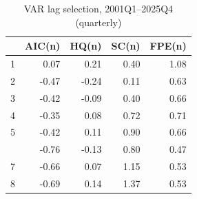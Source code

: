\begin{table}

\caption{\label{tab:tbl-var-select-q}VAR lag selection, 2001Q1--2025Q4 (quarterly)}
\centering
\begin{tabular}[t]{lrrrr}
\toprule
  & AIC(n) & HQ(n) & SC(n) & FPE(n)\\
\midrule
1 & 0.07 & 0.21 & 0.40 & 1.08\\
2 & -0.47 & -0.24 & 0.11 & 0.63\\
3 & -0.42 & -0.09 & 0.40 & 0.66\\
4 & -0.35 & 0.08 & 0.72 & 0.71\\
5 & -0.42 & 0.11 & 0.90 & 0.66\\
\addlinespace
6 & -0.76 & -0.13 & 0.80 & 0.47\\
7 & -0.66 & 0.07 & 1.15 & 0.53\\
8 & -0.69 & 0.14 & 1.37 & 0.53\\
\bottomrule
\end{tabular}
\end{table}
